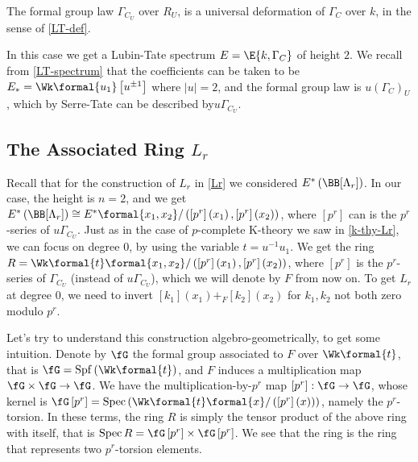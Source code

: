 \begin{theorem}[``$\Gamma_{C_U} = \left({\Gamma_C}\right)_U$"]
	The formal group law $\Gamma_{C_U}$ over $R_U$, is a universal deformation of $\Gamma_C$ over $k$, in the sense of \ref{LT-def}.
\end{theorem}

In this case we get a Lubin-Tate spectrum $E = \E{k, \Gamma_C}$ of height $2$.
We recall from \ref{LT-spectrum} that the coefficients can be taken to be $E_* = \Wk\formal{u_1}\left[u^{\pm 1}\right]$ where $\left|u\right| = 2$, and the formal group law is $u\left(\Gamma_C\right)_U$, which by Serre-Tate can be described by$u \Gamma_{C_U}$.



\subsection{The Associated Ring $L_r$}

Recall that for the construction of $L_r$ in \ref{Lr} we considered $E^*\left(\BB[\Lambda_r]\right)$.
In our case, the height is $n = 2$, and we get
$
E^*\left(\BB[\Lambda_r]\right)
\cong E^*\formal{x_1, x_2}/\left(\left[p^r\right]\left(x_1\right), \left[p^r\right]\left(x_2\right)\right)
$,
where $\left[p^r\right]$ can is the $p^r$-series of $u \Gamma_{C_U}$.
Just as in the case of $p$-complete K-theory we saw in \ref{k-thy-Lr}, we can focus on degree $0$, by using the variable $t = u^{-1} u_1$.
We get the ring $R = \Wk\formal{t}\formal{x_1, x_2}/\left(\left[p^r\right]\left(x_1\right), \left[p^r\right]\left(x_2\right)\right)$, where $\left[p^r\right]$ is the $p^r$-series of $\Gamma_{C_U}$ (instead of $u \Gamma_{C_U}$), which we will denote by $F$ from now on.
To get $L_r$ at degree $0$, we need to invert $\left[k_1\right]\left(x_1\right) +_F \left[k_2\right]\left(x_2\right)$ for $k_1, k_2$ not both zero modulo $p^r$.

Let's try to understand this construction algebro-geometrically, to get some intuition.
Denote by $\fG$ the formal group associated to $F$ over $\Wk\formal{t}$, that is $\fG = \spf\left(\Wk\formal{t}\right)$, and $F$ induces a multiplication map $\fG \times \fG \to \fG$.
We have the multiplication-by-$p^r$ map $\left[p^r\right]: \fG \to \fG$, whose kernel is $\fG\left[p^r\right] = \spec\left(\Wk\formal{t}\formal{x}/\left(\left[p^r\right]\left(x\right)\right)\right)$, namely the $p^r$-torsion.
In these terms, the ring $R$ is simply the tensor product of the above ring with itself, that is $\spec R = \fG\left[p^r\right] \times \fG\left[p^r\right]$.
We see that the ring is the ring that represents two $p^r$-torsion elements.

